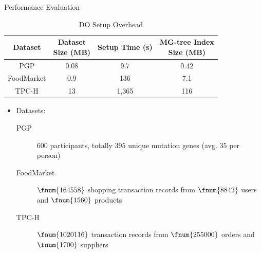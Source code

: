 \documentclass[xcolor={dvipsnames},aspectratio=169,10pt]{beamer}
\begin{document}
\begin{frame}{Performance Evaluation}
  \begin{table}
    \footnotesize
    \begin{tabular}{cccc}
      \toprule
      Dataset & \tabincell{c}{Dataset\\ Size (MB)} & {Setup Time (s)} & \tabincell{c}{MG-tree Index\\Size (MB)} \\
      \midrule
      PGP  & 0.08 & 9.7 & 0.42 \\
      FoodMarket & 0.9 & 136 & 7.1 \\
      TPC-H & 13 & 1,365 & 116 \\
      \bottomrule
    \end{tabular}
    \caption{DO Setup Overhead}
  \end{table}

  \begin{itemize}
    \item Datasets:
      \begin{description}
        \item[PGP] $600$ participants, totally $395$ unique mutation genes (avg. $35$ per person)
        \item[FoodMarket] $\fnum{164558}$ shopping transaction records from $\fnum{8842}$ users and $\fnum{1560}$ products
        \item[TPC-H] $\fnum{1020116}$ transaction records from $\fnum{255000}$ orders and $\fnum{1700}$ suppliers
      \end{description}
  \end{itemize}
\end{frame}
\end{document}
